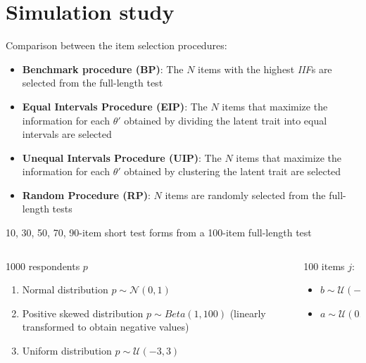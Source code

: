 \documentclass{beamer} %
\begin{document}
\section[Simulation]{Simulation study}

\begin{frame}
	Comparison between the item selection procedures: 
	\begin{itemize}
		\item \textbf{\textcolor{bp}{Benchmark procedure (BP)}}: The $N$ items with the highest \emph{IIF}s are selected from the full-length test
		\item \textbf{\textcolor{eip}{Equal Intervals Procedure (EIP)}}: The $N$ items that maximize the information for each $\theta'$ obtained by dividing the latent trait into equal intervals are selected
		\item \textbf{\textcolor{uip}{Unequal Intervals Procedure (UIP)}}:  The $N$ items that maximize the information for each $\theta'$ obtained by clustering the latent trait are selected 
		\item \textbf{\textcolor{rp}{Random Procedure (RP)}}: $N$ items are randomly selected from the full-length tests 
	\end{itemize}
\vspace{3mm}
10, 30, 50, 70, 90-item short test forms from a  100-item full-length test 

\end{frame}

\begin{frame}
		\begin{columns}[T]
		\begin{column}{.50\linewidth}
			\begin{center}
				1000 respondents $p$
			\end{center}
			\begin{enumerate}
				\item Normal distribution $p \sim \mathcal{N}(0,1)$
				\item Positive skewed distribution $p \sim Beta(1, 100)$ \tiny (linearly transformed to obtain negative values) 
				\item \normalsize Uniform distribution $p \sim \mathcal{U}(-3,3)$
			\end{enumerate}
			
		\end{column}
		
		\begin{column}{.50\linewidth}
			\begin{center}
				100 items $j$:
			\end{center}
			\begin{itemize}
				\item $b \sim \mathcal{U}(-3,3)$
				\item  $a \sim \mathcal{U}(0.40,2)$
			\end{itemize}
		\end{column}
	\end{columns}
\end{frame}
\end{document}
